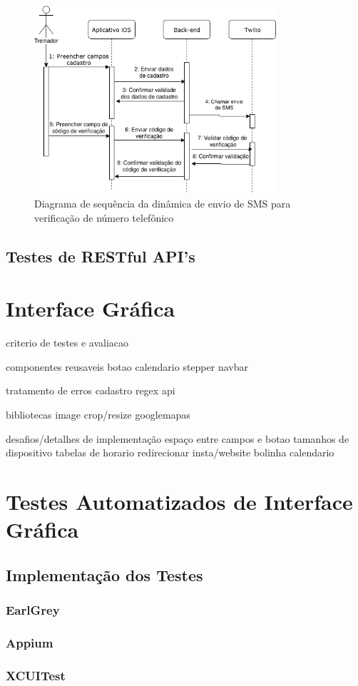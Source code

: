 \begin{figure}[H]
    \centering
    \includegraphics[width=0.8\textwidth]{pfc/figuras/seq-diagram-sms.png}
    \caption{Diagrama de sequência da dinâmica de envio de SMS para verificação de número telefônico}
    \label{fig:seq-diagram-sms}
\end{figure}

\subsection{Testes de RESTful API's}

\section{Interface Gráfica}

criterio de testes e avaliacao

componentes reusaveis
botao
calendario
stepper
navbar

tratamento de erros
cadastro
regex
api

bibliotecas
image crop/resize
googlemapas


desafios/detalhes de implementação
espaço entre campos e botao
tamanhos de dispositivo
tabelas de horario
redirecionar insta/website
bolinha calendario

\section{Testes Automatizados de Interface Gráfica}

\subsection{Implementação dos Testes}

\subsubsection{EarlGrey}

\subsubsection{Appium}

\subsubsection{XCUITest}

